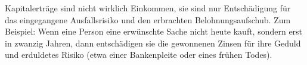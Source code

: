 Kapitalerträge sind nicht wirklich Einkommen, sie sind nur Entschädigung für das eingegangene Ausfallsrisiko und den erbrachten Belohnungsaufschub.
Zum Beispiel: Wenn eine Person eine erwünschte Sache nicht heute kauft, sondern erst in zwanzig Jahren, dann entschädigen sie die gewonnenen Zinsen für ihre Geduld und erduldetes Risiko (etwa einer Bankenpleite oder eines frühen Todes).